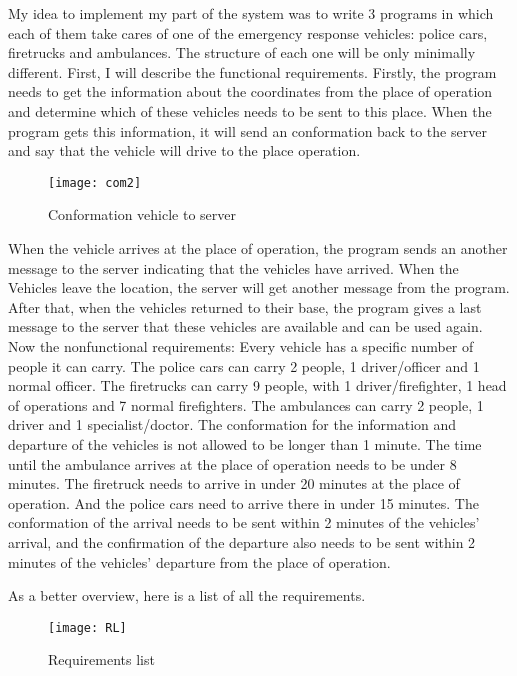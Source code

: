 \documentclass{article}
\begin{document}
\clearpage
My idea to implement my part of the system was to write 3 programs in which each of them take cares of one of the emergency response vehicles: police cars, firetrucks and ambulances. The structure of each one will be only minimally different. First, I will describe the functional requirements.
\newline
Firstly, the program needs to get the information about the coordinates from the place of operation and determine which of these vehicles needs to be sent to this place. When the program gets this information, it will send an conformation back to the server and say that the vehicle will drive to the place operation. 
\newline

\begin{figure}[htp]
    \centering
\texttt{[image: com2]}
    \caption{Conformation vehicle to server}
    \label{fig:GALAXY}
\end{figure}

When the vehicle arrives at the place of operation, the program sends an another message to the server indicating that the vehicles have arrived. When the Vehicles leave the location, the server will get another message from the program. After that, when the vehicles returned to their base, the program gives a last message to the server that these vehicles are available and can be used again.
\newline
\newline
Now the nonfunctional requirements: Every vehicle has a specific number of people it can carry. The police cars can carry 2 people, 1 driver/officer and 1 normal officer. The firetrucks can carry 9 people, with 1 driver/firefighter, 1 head of operations and 7 normal firefighters. The ambulances can carry 2 people, 1 driver and 1 specialist/doctor. 
\newline
The conformation for the information and departure of the vehicles is not allowed to be longer than 1 minute. The time until the ambulance arrives at the place of operation needs to be under 8 minutes. The firetruck needs to arrive in under 20 minutes at the place of operation. And the police cars need to arrive there in under 15 minutes. 
\newline
The conformation of the arrival needs to be sent within 2 minutes of the vehicles' arrival, and the confirmation of the departure also needs to be sent within 2 minutes of the vehicles' departure from the place of operation.

\clearpage
As a better overview, here is a list of all the requirements.
\newline
\newline
\begin{figure}[htp]
    \centering
\texttt{[image: RL]}
    \caption{Requirements list}
    \label{fig:GALAXY}
\end{figure}
\clearpage
\end{document}
